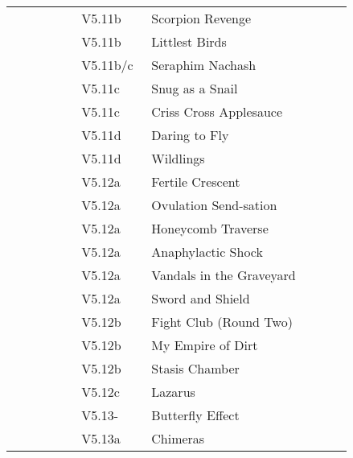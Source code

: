 \begin{flushleft}
\begin{center}
\begin{supertabular}{p{0.18\linewidth}p{0.13\linewidth}p{0.45\linewidth}p{0.08\linewidth}}
  &V5.11b&Scorpion Revenge & \pageref{rt:Scorpion Revenge} \\
  &V5.11b&Littlest Birds & \pageref{rt:Littlest Birds} \\
   &V5.11b/c&Seraphim Nachash & \pageref{rt:Seraphim Nachash} \\
  &V5.11c&Snug as a Snail & \pageref{rt:Snug as a Snail} \\
  &V5.11c&Criss Cross Applesauce & \pageref{rt:Criss Cross Applesauce} \\
   &V5.11d&Daring to Fly & \pageref{rt:Daring to Fly} \\
  &V5.11d&Wildlings & \pageref{rt:Wildlings} \\
   &V5.12a&Fertile Crescent & \pageref{rt:Fertile Crescent} \\
  &V5.12a&Ovulation Send-sation & \pageref{rt:Ovulation Send-sation} \\
  &V5.12a&Honeycomb Traverse & \pageref{vr:Honeycomb Traverse} \\
 &V5.12a&Anaphylactic Shock & \pageref{rt:Anaphylactic Shock} \\
 &V5.12a&Vandals in the Graveyard & \pageref{rt:Vandals in the Graveyard} \\
&V5.12a&Sword and Shield & \pageref{rt:Sword and Shield} \\
   &V5.12b&Fight Club (Round Two) & \pageref{rt:Fight Club (Round Two)} \\
   &V5.12b&My Empire of Dirt & \pageref{rt:My Empire of Dirt} \\
  &V5.12b&Stasis Chamber & \pageref{rt:Stasis Chamber} \\
  &V5.12c&Lazarus & \pageref{vr:Lazarus} \\
&V5.13-&Butterfly Effect & \pageref{rt:Butterfly Effect} \\
&V5.13a&Chimeras & \pageref{rt:Chimeras} \\
\end{supertabular}
\end{center}
\end{flushleft}
\onecolumn
\clearpage